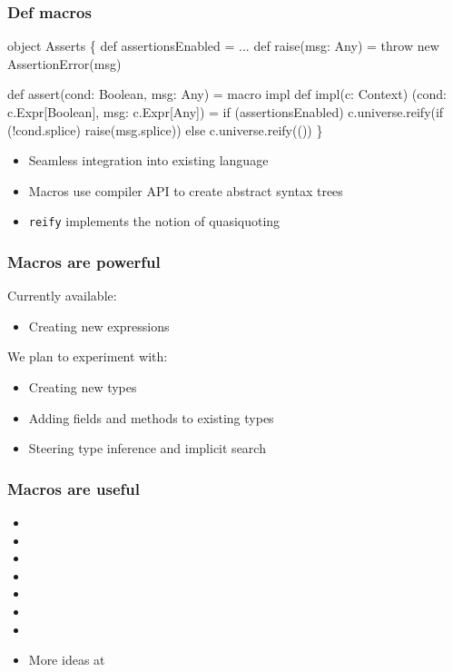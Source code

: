 \documentclass[svgnames,hyperref={bookmarks=false}]{beamer}
\begin{document}
\begin{frame}[fragile]
\frametitle{Def macros}
\begin{semiverbatim}
object Asserts \{
  def assertionsEnabled = ...
  def raise(msg: Any) = throw new AssertionError(msg)

  def assert(cond: Boolean, msg: Any) = macro impl
  def impl(c: Context)
          (cond: c.Expr[Boolean], msg: c.Expr[Any]) =
    if (assertionsEnabled)
      c.universe.reify(if (!cond.splice) raise(msg.splice))
    else
      c.universe.reify(())
\}
\end{semiverbatim}

\begin{itemize}
\item Seamless integration into existing language
\item Macros use compiler API to create abstract syntax trees
\item \texttt{reify} implements the notion of quasiquoting
\end{itemize}
\end{frame}

\begin{frame}[fragile]
\frametitle{Macros are powerful}

Currently available:
\begin{itemize}
\item Creating new expressions
\end{itemize}
\vskip25pt
We plan to experiment with:
\begin{itemize}
\item Creating new types
\item Adding fields and methods to existing types
\item Steering type inference and implicit search
\end{itemize}
\end{frame}

\begin{frame}[fragile]
\frametitle{Macros are useful}

\begin{itemize}
\item {}
\item {}
\item {}
\item {}
\item {}
\item {}
\item {}
\item More ideas at 
\end{itemize}
\end{frame}
\end{document}

